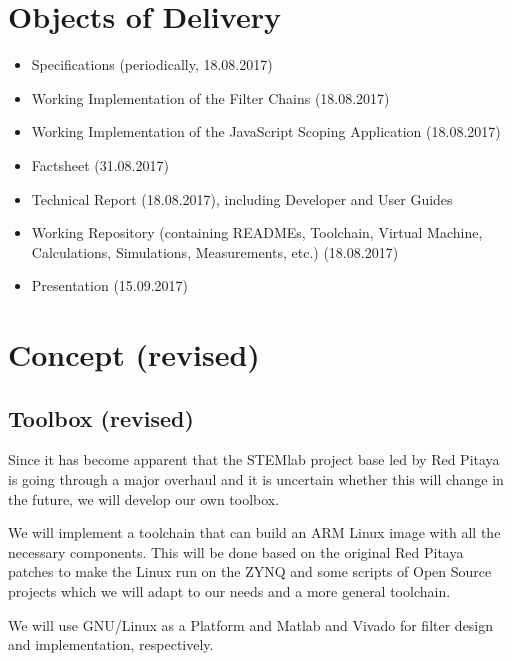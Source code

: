 \documentclass[a4paper,oneside]{alpenspecs/alpenspecs}
\begin{document}
\chapter{Objects of Delivery} %
\label{ch:objectives}

\begin{itemize}
    \item Specifications (periodically, 18.08.2017)
    \item Working Implementation of the Filter Chains (18.08.2017)
    \item Working Implementation of the JavaScript Scoping Application (18.08.2017)
    \item Factsheet (31.08.2017)
    \item Technical Report (18.08.2017), including Developer and User Guides
    \item Working Repository (containing  READMEs, Toolchain, Virtual Machine,
            Calculations, Simulations, Measurements, etc.) (18.08.2017)
    \item Presentation (15.09.2017)
\end{itemize}

\chapter{Concept (revised)} %
\label{ch:concept}

\section{Toolbox (revised)}

Since it has become  apparent that the STEMlab project base  led by Red Pitaya
is going through a major overhaul and it is uncertain whether this will change
in the future, we will develop our own toolbox.

We will implement a  toolchain that can build an ARM Linux  image with all the
necessary  components. This will  be done  based  on the  original Red  Pitaya
patches to  make the Linux  run on  the ZYNQ and  some scripts of  Open Source
projects which we will adapt to our needs and a more general toolchain.

We will use  GNU/Linux as a Platform  and Matlab and Vivado  for filter design
and implementation, respectively.
\end{document}
